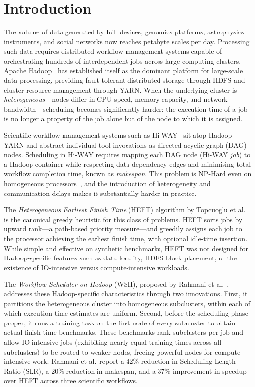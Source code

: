 \documentclass[10pt,twocolumn]{article}
\begin{document}
\section{Introduction}

The volume of data generated by IoT devices, genomics platforms, astrophysics
instruments, and social networks now reaches petabyte scales per day. Processing
such data requires distributed workflow management systems capable of orchestrating
hundreds of interdependent jobs across large computing clusters. Apache
Hadoop~\cite{hadoop2023} has established itself as the dominant platform for
large-scale data processing, providing fault-tolerant distributed storage through
HDFS and cluster resource management through YARN. When the underlying cluster is
\emph{heterogeneous}---nodes differ in CPU speed, memory capacity, and network
bandwidth---scheduling becomes significantly harder: the execution time of a job is
no longer a property of the job alone but of the node to which it is assigned.

Scientific workflow management systems such as Hi-WAY~\cite{hiway2017} sit atop
Hadoop YARN and abstract individual tool invocations as directed acyclic graph (DAG)
nodes. Scheduling in Hi-WAY requires mapping each DAG node (Hi-WAY \emph{job}) to a
Hadoop container while respecting data-dependency edges and minimising total workflow
completion time, known as \emph{makespan}. This problem is NP-Hard even on
homogeneous processors~\cite{hanen1994}, and the introduction of heterogeneity and
communication delays makes it substantially harder in practice.

The \emph{Heterogeneous Earliest Finish Time} (HEFT) algorithm by Topcuoglu
et al.~\cite{heft2002} is the canonical greedy heuristic for this class of
problems. HEFT sorts jobs by upward rank---a path-based priority measure---and
greedily assigns each job to the processor achieving the earliest finish time,
with optional idle-time insertion. While simple and effective on synthetic
benchmarks, HEFT was not designed for Hadoop-specific features such as data
locality, HDFS block placement, or the existence of IO-intensive versus
compute-intensive workloads.

The \emph{Workflow Scheduler on Hadoop} (WSH), proposed by Rahmani
et al.~\cite{rahmani2025}, addresses these Hadoop-specific characteristics through
two innovations. First, it partitions the heterogeneous cluster into homogeneous
subclusters, within each of which execution time estimates are uniform. Second,
before the scheduling phase proper, it runs a training task on the first node of
every subcluster to obtain actual finish-time benchmarks. These benchmarks rank
subclusters per job and allow IO-intensive jobs (exhibiting nearly equal training
times across all subclusters) to be routed to weaker nodes, freeing powerful nodes
for compute-intensive work. Rahmani et al.\ report a 42\% reduction in Scheduling
Length Ratio (SLR), a 20\% reduction in makespan, and a 37\% improvement in speedup
over HEFT across three scientific workflows.
\end{document}
